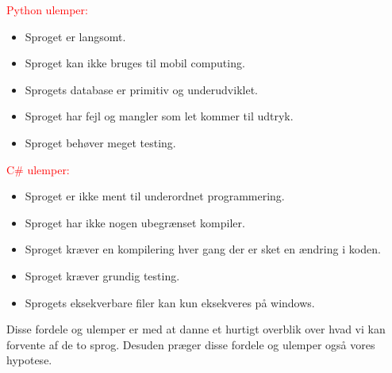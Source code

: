 \documentclass[class=report, crop=false]{standalone}
\begin{document}
        \begin{multicols}{2}
        \raggedcolumns
        \begin{tcolorbox}
        \noindent\textcolor{red}{Python ulemper:}
        \begin{itemize}
            \setlength{\itemsep}{0pt}
            \setlength{\parskip}{0pt}
            \item Sproget er langsomt.
            \item Sproget kan ikke bruges til mobil computing.
            \item Sprogets database er primitiv og underudviklet.
            \item Sproget har fejl og mangler som let kommer til udtryk.
            \item Sproget behøver meget testing.
        \end{itemize}
        \vspace*{4pt}
        \end{tcolorbox}
        \columnbreak

        \begin{tcolorbox}
        \noindent\textcolor{red}{C\# ulemper:}
        \begin{itemize}
            \setlength{\itemsep}{0pt}
            \setlength{\parskip}{0pt}
            \item Sproget er ikke ment til underordnet programmering.
            \item Sproget har ikke nogen ubegrænset kompiler.
            \item Sproget kræver en kompilering hver gang der er sket en ændring i koden.
            \item Sproget kræver grundig testing.
            \item Sprogets eksekverbare filer kan kun eksekveres på windows.
        \end{itemize}
        \end{tcolorbox}
        \end{multicols}
        \noindent Disse fordele og ulemper er med at danne et hurtigt overblik over hvad vi kan forvente af de to sprog. Desuden præger disse fordele og ulemper også vores hypotese.
\end{document}
